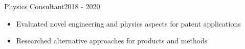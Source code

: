 
\subtitle{CSAA Insurance}{Physics Consultant}{2018 - 2020}

\begin{itemize}
    \item Evaluated novel engineering and physics aspects for patent applications
    \item Researched alternative approaches for products and methods
\end{itemize}
